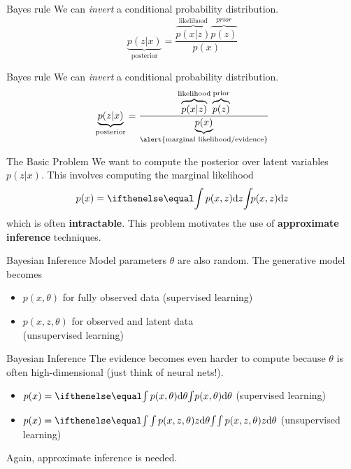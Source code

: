 \documentclass[14pt]{beamer}
\begin{document}
\begin{frame}{Bayes rule}
We can \textit{invert} a conditional probability distribution.
\begin{equation*}
\underbrace{p(z|x)}_{\text{posterior}} = \frac{\overbrace{p(x|z)}^{\text{likelihood}}\overbrace{p(z)}^{prior}}{p(x)}
\end{equation*}
\end{frame}

\begin{frame}{Bayes rule}
We can \textit{invert} a conditional probability distribution.
\begin{equation*}
\underbrace{p(z|x)}_{\text{posterior}} = \frac{\overbrace{p(x|z)}^{\text{likelihood}}\overbrace{p(z)}^{\text{prior}}}{\underbrace{p(x)}_{\text{\alert{marginal likelihood/evidence}}}}
\end{equation*}
\end{frame}

\begin{frame}{The Basic Problem}
We want to compute the posterior over latent variables $ p(z|x) $. This involves computing the marginal likelihood
$$ p(x) = \intl{ p(x,z) }{z} $$
which is often \textbf{intractable}. This problem motivates the use of \textbf{approximate inference} techniques.
\end{frame}

\begin{frame}{Bayesian Inference}
Model parameters $ \theta $ are also random. The generative model becomes
\begin{itemize}
\item $ p(x,\theta) $ for fully observed data (supervised learning)
\item $ p(x,z,\theta) $ for observed and latent data \\ (unsupervised learning)
\end{itemize}
\end{frame}

\begin{frame}{Bayesian Inference}
The evidence becomes even harder to compute because $ \theta $ is often high-dimensional
(just think of neural nets!).
\begin{itemize}
\item $ p(x) = \intl{ p(x, \theta)}{\theta} $ (supervised learning)
\item $ p(x) = \intl{ \int{ p(x, z, \theta)} {z}}{\theta} $ (unsupervised learning)
\end{itemize}
\pause
Again, approximate inference is needed.
\end{frame}
\end{document}
